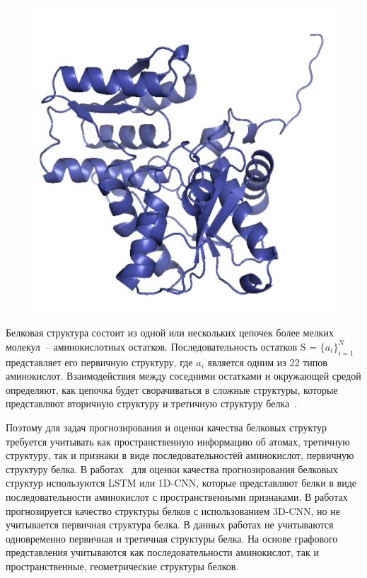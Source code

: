 \documentclass[14pt]{extarticle}
\begin{document}
\begin{figure}[H]
{		\includegraphics[scale=0.32]{model_T0861.pdf}}
	\label{fig:edge}
\end{figure}
Белковая структура состоит из одной или нескольких цепочек более мелких молекул~-- аминокислотных остатков. Последовательность остатков S = $\{a_i\}_{i=1}^N$ представляет его первичную структуру, где $a_i$ является одним из 22 типов аминокислот. Взаимодействия между соседними остатками и окружающей средой определяют, как цепочка будет сворачиваться в сложные структуры, которые представляют вторичную структуру и третичную структуру белка~\cite{Baldassarre2019GraphQAPM}.

Поэтому для задач прогнозирования и оценки качества белковых структур требуется учитывать как пространственную информацию об атомах, третичную структуру, так и признаки в виде последовательностей аминокислот, первичную структуру белка.  В работах~\cite{HurtadoQA, AngularQA} для оценки качества прогнозирования белковых структур используются LSTM или 1D-CNN, которые представляют белки в виде последовательности аминокислот с пространственными признаками.  В работах~\cite{3DCNN, 10.1093/bioinformatics/btz122} прогнозируется качество структуры белков с использованием 3D-CNN, но не учитывается первичная структура белка. В данных работах не учитываются одновременно первичная и третичная структуры белка. На основе графового представления учитываются как последовательности аминокислот, так и пространственные, геометрические структуры белков. 
\end{document}
